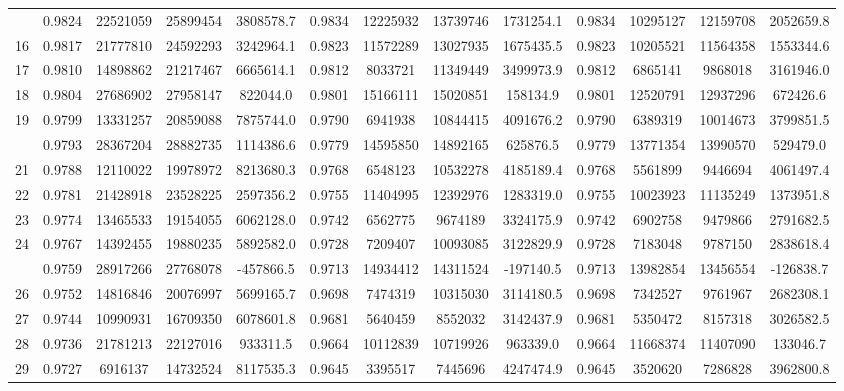\documentclass[
  12pt,
]{article}
\begin{document}
\begin{longtable}[t]{lcccccccccccc}
\addlinespace
15 & 0.9824 & 22521059 & 25899454 & 3808578.7 & 0.9834 & 12225932 & 13739746 & 1731254.1 & 0.9834 & 10295127 & 12159708 & 2052659.8\\
16 & 0.9817 & 21777810 & 24592293 & 3242964.1 & 0.9823 & 11572289 & 13027935 & 1675435.5 & 0.9823 & 10205521 & 11564358 & 1553344.6\\
17 & 0.9810 & 14898862 & 21217467 & 6665614.1 & 0.9812 & 8033721 & 11349449 & 3499973.9 & 0.9812 & 6865141 & 9868018 & 3161946.0\\
18 & 0.9804 & 27686902 & 27958147 & 822044.0 & 0.9801 & 15166111 & 15020851 & 158134.9 & 0.9801 & 12520791 & 12937296 & 672426.6\\
19 & 0.9799 & 13331257 & 20859088 & 7875744.0 & 0.9790 & 6941938 & 10844415 & 4091676.2 & 0.9790 & 6389319 & 10014673 & 3799851.5\\
\addlinespace
20 & 0.9793 & 28367204 & 28882735 & 1114386.6 & 0.9779 & 14595850 & 14892165 & 625876.5 & 0.9779 & 13771354 & 13990570 & 529479.0\\
21 & 0.9788 & 12110022 & 19978972 & 8213680.3 & 0.9768 & 6548123 & 10532278 & 4185189.4 & 0.9768 & 5561899 & 9446694 & 4061497.4\\
22 & 0.9781 & 21428918 & 23528225 & 2597356.2 & 0.9755 & 11404995 & 12392976 & 1283319.0 & 0.9755 & 10023923 & 11135249 & 1373951.8\\
23 & 0.9774 & 13465533 & 19154055 & 6062128.0 & 0.9742 & 6562775 & 9674189 & 3324175.9 & 0.9742 & 6902758 & 9479866 & 2791682.5\\
24 & 0.9767 & 14392455 & 19880235 & 5892582.0 & 0.9728 & 7209407 & 10093085 & 3122829.9 & 0.9728 & 7183048 & 9787150 & 2838618.4\\
\addlinespace
25 & 0.9759 & 28917266 & 27768078 & -457866.5 & 0.9713 & 14934412 & 14311524 & -197140.5 & 0.9713 & 13982854 & 13456554 & -126838.7\\
26 & 0.9752 & 14816846 & 20076997 & 5699165.7 & 0.9698 & 7474319 & 10315030 & 3114180.5 & 0.9698 & 7342527 & 9761967 & 2682308.1\\
27 & 0.9744 & 10990931 & 16709350 & 6078601.8 & 0.9681 & 5640459 & 8552032 & 3142437.9 & 0.9681 & 5350472 & 8157318 & 3026582.5\\
28 & 0.9736 & 21781213 & 22127016 & 933311.5 & 0.9664 & 10112839 & 10719926 & 963339.0 & 0.9664 & 11668374 & 11407090 & 133046.7\\
29 & 0.9727 & 6916137 & 14732524 & 8117535.3 & 0.9645 & 3395517 & 7445696 & 4247474.9 & 0.9645 & 3520620 & 7286828 & 3962800.8\\

\end{longtable}
\end{document}
